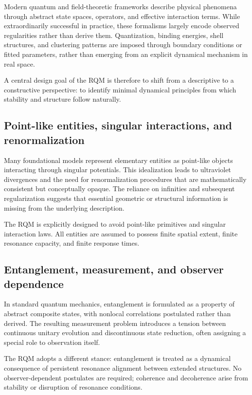 \documentclass[11pt,a4paper]{article}
\begin{document}
Modern quantum and field-theoretic frameworks describe physical phenomena through abstract
state spaces, operators, and effective interaction terms. While extraordinarily successful
in practice, these formalisms largely encode observed regularities rather than derive them.
Quantization, binding energies, shell structures, and clustering patterns are imposed through
boundary conditions or fitted parameters, rather than emerging from an explicit dynamical
mechanism in real space.

A central design goal of the RQM is therefore to shift from a descriptive to a constructive
perspective: to identify minimal dynamical principles from which stability and structure
follow naturally.

\subsection{Point-like entities, singular interactions, and renormalization}

Many foundational models represent elementary entities as point-like objects interacting
through singular potentials. This idealization leads to ultraviolet divergences and the need
for renormalization procedures that are mathematically consistent but conceptually opaque.
The reliance on infinities and subsequent regularization suggests that essential geometric
or structural information is missing from the underlying description.

The RQM is explicitly designed to avoid point-like primitives and singular interaction laws.
All entities are assumed to possess finite spatial extent, finite resonance capacity, and
finite response times.

\subsection{Entanglement, measurement, and observer dependence}

In standard quantum mechanics, entanglement is formulated as a property of abstract composite
states, with nonlocal correlations postulated rather than derived. The resulting measurement
problem introduces a tension between continuous unitary evolution and discontinuous state
reduction, often assigning a special role to observation itself.

The RQM adopts a different stance: entanglement is treated as a dynamical consequence of
persistent resonance alignment between extended structures. No observer-dependent postulates
are required; coherence and decoherence arise from stability or disruption of resonance
conditions.
\end{document}
